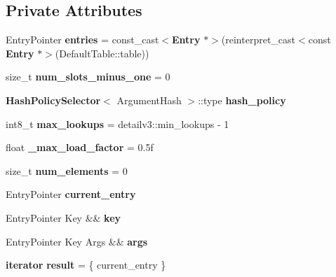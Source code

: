 \subsection*{Private Attributes}
\begin{DoxyCompactItemize}
\item 
Entry\+Pointer {\bfseries entries} = const\+\_\+cast$<${\bf Entry} $\ast$$>$(reinterpret\+\_\+cast$<$const {\bf Entry} $\ast$$>$(Default\+Table\+::table))\label{classska_1_1detailv3_1_1sherwood__v3__table_ae1589776281f4e41cce8480108528966}

\item 
size\+\_\+t {\bfseries num\+\_\+slots\+\_\+minus\+\_\+one} = 0\label{classska_1_1detailv3_1_1sherwood__v3__table_a429f76f8c4db79ffb508c771af707bec}

\item 
{\bf Hash\+Policy\+Selector}$<$ Argument\+Hash $>$\+::type {\bfseries hash\+\_\+policy}\label{classska_1_1detailv3_1_1sherwood__v3__table_a42bdf8be15a2681dc756b7ea90e7df54}

\item 
int8\+\_\+t {\bfseries max\+\_\+lookups} = detailv3\+::min\+\_\+lookups -\/ 1\label{classska_1_1detailv3_1_1sherwood__v3__table_afad29da26ad8cbd730d75fd420d37ea8}

\item 
float {\bfseries \+\_\+max\+\_\+load\+\_\+factor} = 0.\+5f\label{classska_1_1detailv3_1_1sherwood__v3__table_a99df4bd36240137cc818a50719e8e731}

\item 
size\+\_\+t {\bfseries num\+\_\+elements} = 0\label{classska_1_1detailv3_1_1sherwood__v3__table_a2b9f43ccdb9c9b59430b59249b035c4b}

\item 
Entry\+Pointer {\bfseries current\+\_\+entry}\label{classska_1_1detailv3_1_1sherwood__v3__table_a9769bdcca4c87de6a37cfcbcd64bb918}

\item 
Entry\+Pointer Key \&\& {\bfseries key}\label{classska_1_1detailv3_1_1sherwood__v3__table_ad0be4cf3e612706ff6f5af9cebf73321}

\item 
Entry\+Pointer Key Args \&\& {\bfseries args}
\item 
{\bf iterator} {\bfseries result} = \{ current\+\_\+entry \}\label{classska_1_1detailv3_1_1sherwood__v3__table_aed2a992cbbfa3ef56e6dc2fbbfcac8bb}

\end{DoxyCompactItemize}


